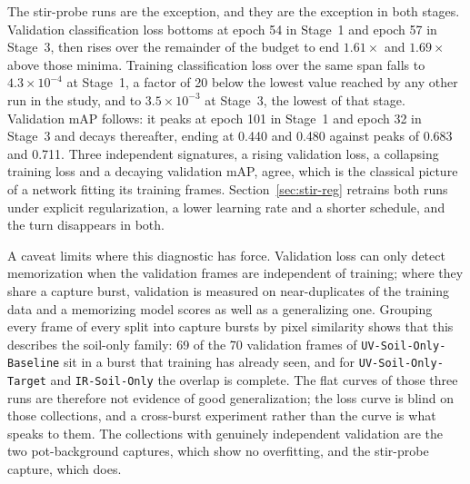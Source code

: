 ﻿\documentclass[journal]{IEEEtran}
\begin{document}
The stir-probe runs are the exception, and they are the exception in both stages. Validation classification loss bottoms at epoch 54 in Stage~1 and epoch 57 in Stage~3, then rises over the remainder of the budget to end $1.61\times$ and $1.69\times$ above those minima. Training classification loss over the same span falls to $4.3 \times 10^{-4}$ at Stage~1, a factor of 20 below the lowest value reached by any other run in the study, and to $3.5 \times 10^{-3}$ at Stage~3, the lowest of that stage. Validation mAP follows: it peaks at epoch 101 in Stage~1 and epoch 32 in Stage~3 and decays thereafter, ending at 0.440 and 0.480 against peaks of 0.683 and 0.711. Three independent signatures, a rising validation loss, a collapsing training loss and a decaying validation mAP, agree, which is the classical picture of a network fitting its training frames. Section~\ref{sec:stir-reg} retrains both runs under explicit regularization, a lower learning rate and a shorter schedule, and the turn disappears in both.

A caveat limits where this diagnostic has force. Validation loss can only detect memorization when the validation frames are independent of training; where they share a capture burst, validation is measured on near-duplicates of the training data and a memorizing model scores as well as a generalizing one. Grouping every frame of every split into capture bursts by pixel similarity shows that this describes the soil-only family: 69 of the 70 validation frames of \texttt{UV-Soil-Only-Baseline} sit in a burst that training has already seen, and for \texttt{UV-Soil-Only-Target} and \texttt{IR-Soil-Only} the overlap is complete. The flat curves of those three runs are therefore not evidence of good generalization; the loss curve is blind on those collections, and a cross-burst experiment rather than the curve is what speaks to them. The collections with genuinely independent validation are the two pot-background captures, which show no overfitting, and the stir-probe capture, which does.
\end{document}
